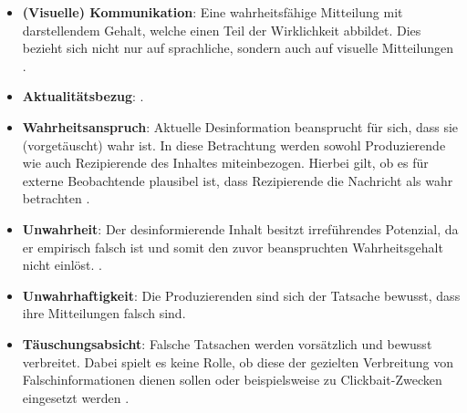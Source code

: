 \documentclass[12pt,a4paper]{article}        %
\begin{document}
\begin{itemize}
  \item \textbf{(Visuelle) Kommunikation}: Eine wahrheitsfähige Mitteilung mit darstellendem Gehalt, welche einen Teil der Wirklichkeit abbildet. Dies bezieht sich nicht nur auf sprachliche, sondern auch auf visuelle Mitteilungen \parencite[151]{marx_fake_2020}.
  \item \textbf{Aktualitätsbezug}:  \parencite[152]{marx_fake_2020}.
  \item \textbf{Wahrheitsanspruch}: Aktuelle Desinformation beansprucht für sich, dass sie (vorgetäuscht) wahr ist. In diese Betrachtung werden sowohl Produzierende wie auch Rezipierende des Inhaltes miteinbezogen. Hierbei gilt, ob es für externe Beobachtende plausibel ist, dass Rezipierende die Nachricht als wahr betrachten \parencite[153]{marx_fake_2020}.
  \item \textbf{Unwahrheit}: Der desinformierende Inhalt besitzt irreführendes Potenzial, da er empirisch falsch ist und somit den zuvor beanspruchten Wahrheitsgehalt nicht einlöst. \parencite[154]{marx_fake_2020}.
  \item \textbf{Unwahrhaftigkeit}: Die Produzierenden sind sich der Tatsache bewusst, dass ihre Mitteilungen falsch sind. \parencite[156]{marx_fake_2020}
  \item \textbf{Täuschungsabsicht}: Falsche Tatsachen werden vorsätzlich und bewusst verbreitet. Dabei spielt es keine Rolle, ob diese der gezielten Verbreitung von Falschinformationen dienen sollen oder beispielsweise zu Clickbait-Zwecken eingesetzt werden \parencites[157]{marx_fake_2020}[vgl.\ auch][2]{khan_fake_2021}.
\end{itemize}
\end{document}
